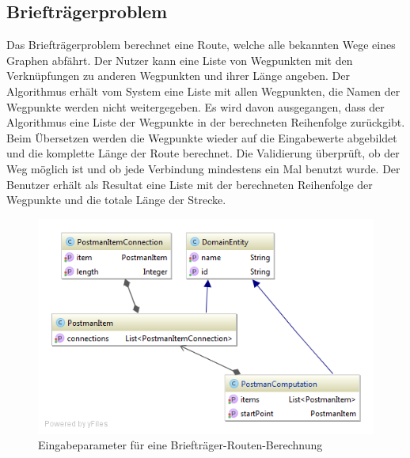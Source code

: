 \subsection{Briefträgerproblem}
Das Briefträgerproblem berechnet eine Route, welche alle bekannten Wege eines Graphen abfährt. Der Nutzer kann eine Liste von Wegpunkten mit den Verknüpfungen zu anderen 
Wegpunkten und ihrer Länge angeben. Der Algorithmus erhält vom System eine Liste mit allen Wegpunkten, die Namen der Wegpunkte werden nicht weitergegeben. Es wird davon ausgegangen, 
dass der Algorithmus eine Liste der Wegpunkte in der berechneten Reihenfolge zurückgibt. Beim Übersetzen werden die Wegpunkte wieder auf die Eingabewerte abgebildet und die komplette 
Länge der Route berechnet. Die Validierung überprüft, ob der Weg möglich ist und ob jede Verbindung mindestens ein Mal benutzt wurde. Der Benutzer erhält als Resultat eine Liste mit der berechneten 
Reihenfolge der Wegpunkte und die totale Länge der Strecke.

\begin{figure}[h]
\centering
\includegraphics[scale=0.5]{images/probleme/postman.png}
\caption[Eingabeparameter für eine Briefträger-Routen-Berechnung]{Eingabeparameter für eine Briefträger-Routen-Berechnung \selfmade{}}
\label{fig:postman_input}
\end{figure}

\FloatBarrier
%
%
%
%

